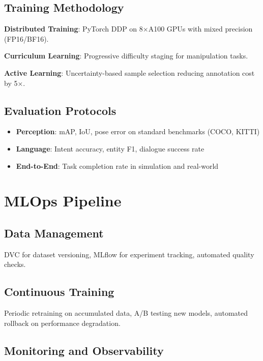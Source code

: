 \documentclass[conference]{IEEEtran}
\begin{document}
\subsection{Training Methodology}

\textbf{Distributed Training}: PyTorch DDP on 8×A100 GPUs with mixed precision (FP16/BF16).

\textbf{Curriculum Learning}: Progressive difficulty staging for manipulation tasks.

\textbf{Active Learning}: Uncertainty-based sample selection reducing annotation cost by 5×.

\subsection{Evaluation Protocols}

\begin{itemize}
    \item \textbf{Perception}: mAP, IoU, pose error on standard benchmarks (COCO, KITTI)
    \item \textbf{Language}: Intent accuracy, entity F1, dialogue success rate
    \item \textbf{End-to-End}: Task completion rate in simulation and real-world
\end{itemize}

\section{MLOps Pipeline}
\label{sec:mlops}

\subsection{Data Management}

DVC for dataset versioning, MLflow for experiment tracking, automated quality checks.

\subsection{Continuous Training}

Periodic retraining on accumulated data, A/B testing new models, automated rollback on performance degradation.

\subsection{Monitoring and Observability}
\end{document}
